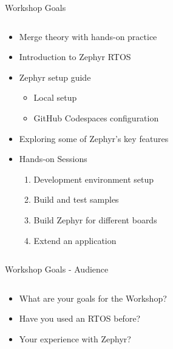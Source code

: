 \documentclass[10pt, aspectratio=169]{beamer}
\begin{document}
\begin{frame}[fragile]{Workshop Goals}
  \begin{columns}[]
    \begin{column}{0.6\textwidth}
      \begin{itemize}
        \item Merge theory with hands-on practice
        \item Introduction to Zephyr RTOS
        \item Zephyr setup guide
          \begin{itemize}
            \item Local setup
            \item GitHub Codespaces configuration
          \end{itemize}
        \item Exploring some of Zephyr's key features
        \item Hands-on Sessions
          \begin{enumerate}
            \item Development environment setup
            \item Build and test samples
            \item Build Zephyr for different boards
            \item Extend an application
          \end{enumerate}
      \end{itemize}
    \end{column}
    \begin{column}{0.4\textwidth}
    \end{column}
  \end{columns}
\end{frame}
\begin{frame}[fragile]{Workshop Goals - Audience}
  \begin{columns}[]
    \begin{column}{0.6\textwidth}
      \begin{itemize}
        \item What are your goals for the Workshop?
        \item Have you used an RTOS before?
        \item Your experience with Zephyr?
      \end{itemize}
    \end{column}
    \begin{column}{0.4\textwidth}
    \end{column}
  \end{columns}
\end{frame}
\end{document}
